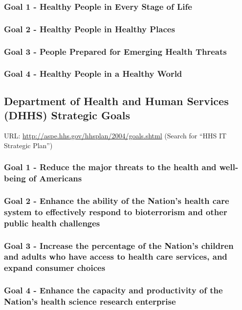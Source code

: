 \documentclass[11pt]{article}
\begin{document}
\subsubsection{Goal 1 - Healthy People in Every Stage of Life}
\label{sec:org93aedbf}
\subsubsection{Goal 2 - Healthy People in Healthy Places}
\label{sec:org7f66963}
\subsubsection{Goal 3 - People Prepared for Emerging Health Threats}
\label{sec:orgc00a34f}
\subsubsection{Goal 4 - Healthy People in a Healthy World}
\label{sec:org7815423}

\subsection{Department of Health and Human Services (DHHS) Strategic Goals}
\label{sec:org29c088d}
URL: \url{http://aspe.hhs.gov/hhsplan/2004/goals.shtml} (Search for “HHS IT Strategic Plan”)
\subsubsection{Goal 1 - Reduce the major threats to the health and well-being of Americans}
\label{sec:org6ce3fae}
\subsubsection{Goal 2 - Enhance the ability of the Nation’s health care system to effectively respond to bioterrorism and other public health challenges}
\label{sec:org1479e4b}
\subsubsection{Goal 3 - Increase the percentage of the Nation’s children and adults who have access to health care services, and expand consumer choices}
\label{sec:org385a42a}
\subsubsection{Goal 4 - Enhance the capacity and productivity of the Nation’s health science research enterprise}
\label{sec:org38e9957}
\end{document}

